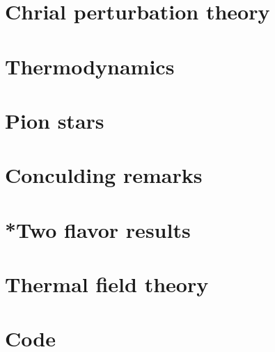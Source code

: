 \documentclass{book}
\begin{document}
    \chapter{Chrial perturbation theory}
    \label{chapter: chpt}
    
    
    
    

    \chapter{Thermodynamics}
    \label{chapter: thermodynamics}
    
    
    
    

    \chapter{Pion stars}
    \label{chapter: pion stars}
    

    \chapter{Conculding remarks}
    \label{Chapter: cocnlusion and discussion}
    

    \appendix

    \chapter[Appendix A]{}
    
    
    
    
    

    \chapter{*Two flavor results}
    
    
    
    
    \chapter{Thermal field theory}
    \label{appendix: thermal field theory}
    
    
    
    
    
    
    
    \chapter{Code}
    

    \cleardoublepage
    \printbibliography
\end{document}
